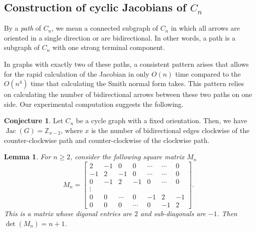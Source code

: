\documentclass[11pt,reqno]{amsart}
\DeclareMathOperator{\Jac}{Jac}
\theoremstyle{definition}
\newtheorem{conj}[mydef]{Conjecture}
\theoremstyle{plain}
\newtheorem{lemma}[mydef]{Lemma}
\begin{document}
	

\subsection{Construction of cyclic Jacobians of $C_n$}
By a \textit{path} of $C_n$, we mean a connected subgraph of $C_n$ in which all arrows are oriented in a single direction or are bidirectional. In other words, a path is a subgraph of $C_n$ with one strong terminal component. 
				
In graphs with exactly two of these paths, a consistent pattern arises that allows for the rapid calculation of the Jacobian in only $O(n)$ time compared to the $O(n^4)$ time that calculating the Smith normal form takes. This pattern relies on calculating the number of bidirectional arrows between these two paths on one side. Our experimental computation suggests the following. 

		\begin{conj}\label{conjecture: two path}
Let $C_n$ be a cycle graph with a fixed orientation. Then, we have $\Jac(G)=\mathbb{Z}_{x-2}$, where $x$ is the number of bidirectional edges clockwise of the counter-clockwise path and counter-clockwise of the clockwise path.
		\end{conj}


		\begin{lemma} \label{obj3}
			For $n \ge 2$, consider the following square matrix $M_n$
			\begin{equation}
				M_n = \begin{bmatrix}
					2 & -1 & 0 & 0& \cdots & \cdots & 0 \\
					-1 & 2 & -1& 0& \cdots &\cdots & 0 \\
					0 & -1 & 2 & -1 & 0& \cdots & 0 \\
					\vdots \\
					0 & 0 & \cdots& 0 & -1 & 2 & -1 \\
					0 & 0 &0 & \cdots & 0 &  -1 & 2 
					\end{bmatrix}.
			\end{equation}
			This is a matrix whose digonal entries are $2$ and sub-diagonals are $-1$. Then $\det (M_n) = n+1$. 
		\end{lemma}
		
\end{document}
